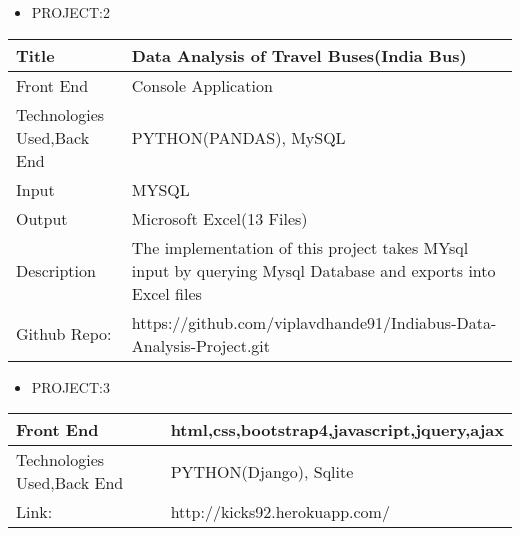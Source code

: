 \documentclass[a4paper,10pt]{article}
\begin{document}
 
 
 
\vspace{5mm}

 
 \renewcommand{\labelitemi}{$\blacksquare$}
 
 
 \begin{itemize}
   \item {\large PROJECT:2}
   
 \end{itemize}


\begin{tabu} to 0.9\textwidth { | X[l] | X[2.5] | }
 \hline
 \large Title & Data Analysis of Travel Buses(India Bus)\\
 
 \hline
\large Front End  & Console Application\\
 

 \hline
 \large Technologies Used,Back End    & PYTHON(PANDAS), MySQL \\
 
 \hline
\large Input  & MYSQL   \\


\hline
\large Output  & Microsoft Excel(13 Files)   \\
 
 \hline
\large Description & The implementation of this project takes MYsql input by querying Mysql Database and exports into Excel files \\


\hline
\large Github Repo: & https://github.com/viplavdhande91/Indiabus-Data-Analysis-Project.git \\
 
 
\hline
 

 
\end{tabu}
 
 
 
 
 \vspace{5mm}

 
 
 
 \begin{itemize}
   \item {\large PROJECT:3}
   
 \end{itemize}


\begin{tabu} to 0.9\textwidth { | X[l] | X[2.5] | }

 
 \hline
\large Front End  & html,css,bootstrap4,javascript,jquery,ajax\\
 

 \hline
 \large Technologies Used,Back End    & PYTHON(Django), Sqlite \\
 
 

 

\hline
\large Link: & http://kicks92.herokuapp.com/ \\
 
 
\hline
 

 
\end{tabu}
 
\end{document}
